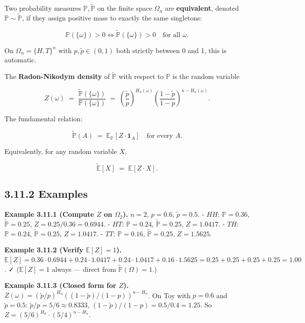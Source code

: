 \documentclass[
  10pt,
  twoside]{book}
\begin{document}
Two probability measures \(\mathbb P, \tilde{\mathbb P}\) on the finite
space \(\Omega_n\) are \textbf{equivalent}, denoted
\(\mathbb P \sim \tilde{\mathbb P}\), if they assign positive mass to
exactly the same singletons:

\[\mathbb P(\{\omega\}) > 0 \iff \tilde{\mathbb P}(\{\omega\}) > 0 \quad \text{for all } \omega.\]

On \(\Omega_n = \{H,T\}^n\) with \(p, \tilde p \in (0,1)\) both strictly
between 0 and 1, this is automatic.

The \textbf{Radon-Nikodym density} of \(\tilde{\mathbb P}\) with respect
to \(\mathbb P\) is the random variable

\[Z(\omega) \;=\; \frac{\tilde{\mathbb P}(\{\omega\})}{\mathbb P(\{\omega\})} \;=\; \left(\frac{\tilde p}{p}\right)^{H_n(\omega)} \left(\frac{1-\tilde p}{1-p}\right)^{n - H_n(\omega)}.\]

The fundamental relation:

\[\tilde{\mathbb P}(A) \;=\; \mathbb E_{\mathbb P}[Z\cdot \mathbf 1_A] \quad\text{for every } A.\]

Equivalently, for any random variable \(X\),

\[\tilde{\mathbb E}[X] \;=\; \mathbb E[Z \cdot X].\]

\subsection{3.11.2 Examples}\label{examples-21}

\textbf{Example 3.11.1 (Compute \(Z\) on \(\Omega_2\)).} \(n=2\),
\(p=0.6\), \(\tilde p=0.5\). - \(HH\): \(\mathbb P = 0.36\),
\(\tilde{\mathbb P} = 0.25\), \(Z = 0.25/0.36 = 0.6944\). - \(HT\):
\(\mathbb P = 0.24\), \(\tilde{\mathbb P} = 0.25\), \(Z = 1.0417\). -
\(TH\): \(\mathbb P = 0.24\), \(\tilde{\mathbb P} = 0.25\),
\(Z = 1.0417\). - \(TT\): \(\mathbb P = 0.16\),
\(\tilde{\mathbb P} = 0.25\), \(Z = 1.5625\).

\textbf{Example 3.11.2 (Verify \(\mathbb E[Z] = 1\)).}
\(\mathbb E[Z] = 0.36 \cdot 0.6944 + 0.24 \cdot 1.0417 + 0.24 \cdot 1.0417 + 0.16 \cdot 1.5625 = 0.25 + 0.25 + 0.25 + 0.25 = 1.00\).
✓ (\(\mathbb E[Z] = 1\) always --- direct from
\(\tilde{\mathbb P}(\Omega) = 1\).)

\textbf{Example 3.11.3 (Closed form for \(Z\)).}
\(Z(\omega) = (\tilde p/p)^{H_n} ((1-\tilde p)/(1-p))^{n-H_n}\). On Toy
with \(p=0.6\) and \(\tilde p = 0.5\):
\(\tilde p/p = 5/6 \approx 0.8333\),
\((1-\tilde p)/(1-p) = 0.5/0.4 = 1.25\). So
\(Z = (5/6)^{H_n} \cdot (5/4)^{n - H_n}\).
\end{document}
